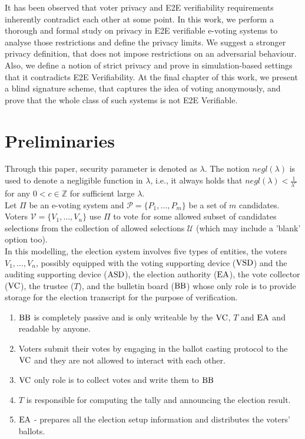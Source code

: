 It has been observed that voter privacy and E2E verifiability requirements inherently contradict each other at some point. In this work, we perform a thorough and formal study on privacy in E2E verifiable e-voting systems to analyse those restrictions and define the privacy limits. We suggest a stronger privacy definition, that does not impose restrictions on an adversarial behaviour. Also, we define a notion of strict privacy and prove in simulation-based settings that it contradicts E2E Verifiability. At the final chapter of this work, we present a blind signature scheme, that captures the idea of voting anonymously, and prove that the whole class of such systems is not E2E Verifiable.  

\section{Preliminaries}
Through this paper, security parameter is denoted as $\lambda$. The notion $negl(\lambda)$ is used to denote a negligible function in $\lambda$, i.e., it always holds that $negl(\lambda) < \frac{1}{\lambda^c}$ for any $0<c \in \mathbb{Z}$ for sufficient large $\lambda$. \\

Let $\Pi$ be an e-voting system and $\mathcal{P} = \{P_1,\dots,P_m\}$ be a set of $m$ candidates. Voters $\mathcal{V} = \{V_1,\dots,V_n\}$ use $\Pi$ to vote for some allowed subset of candidates selections from the collection of allowed selections $\mathcal{U}$ (which may include a 'blank' option too). \\
 
 In this modelling, the election system involves five types of entities, the voters $V_1, \dots , V_n$, possibly equipped with the voting supporting device ($\operatorname{VSD}$) and the auditing supporting device ($\operatorname{ASD}$), the election authority ($\operatorname{EA}$), the vote collector ($\operatorname{VC}$), the trustee ($T$), and the bulletin board ($\operatorname{BB}$) whose only role is to provide storage for the election transcript for the purpose of verification. 
\begin{enumerate}
\item $\operatorname{BB}$ is completely passive and is only writeable by the $\operatorname{VC}$, $T$ and $\operatorname{EA}$ and readable by anyone. 
\item Voters submit their votes by engaging in the ballot casting protocol to the $\operatorname{VC}$ and they are not allowed to interact with each other. 
\item $\operatorname{VC}$ only role is to collect votes and write them to $\operatorname{BB}$
\item $T$ is responsible for computing the tally and announcing the election result.
\item $\operatorname{EA}$ - prepares all the election setup information and distributes the voters' ballots.
\end{enumerate}

